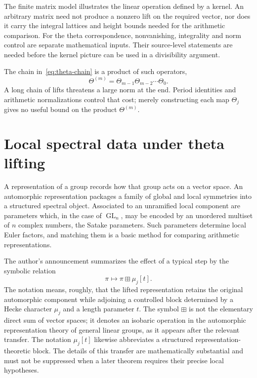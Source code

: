 \documentclass[11pt,openany,oneside]{scrbook}
\theoremstyle{definition}
\theoremstyle{remark}
\begin{document}
The finite matrix model illustrates the linear operation defined by a kernel. An arbitrary matrix need not produce a nonzero lift on the required vector, nor does it carry the integral lattices and height bounds needed for the arithmetic comparison. For the theta correspondence, nonvanishing, integrality and norm control are separate mathematical inputs. Their source-level statements are needed before the kernel picture can be used in a divisibility argument.

The chain in~\eqref{eq:theta-chain} is a product of such operators,
\begin{equation}\label{eq:composite}
\Theta^{(m)}=\Theta_{m-1}\Theta_{m-2}\cdots\Theta_0.
\end{equation}
A long chain of lifts threatens a large norm at the end. Period identities and arithmetic normalizations control that cost; merely constructing each map $\Theta_j$ gives no useful bound on the product $\Theta^{(m)}$.

\section{Local spectral data under theta lifting}

A representation of a group records how that group acts on a vector space. An automorphic representation packages a family of global and local symmetries into a structured spectral object. Associated to an unramified local component are parameters which, in the case of $\operatorname{GL}_n$, may be encoded by an unordered multiset of $n$ complex numbers, the Satake parameters. Such parameters determine local Euler factors, and matching them is a basic method for comparing arithmetic representations.

The author's announcement summarizes the effect of a typical step by the symbolic relation
\begin{equation}\label{eq:isobaric}
\pi\longmapsto\pi\boxplus\mu_j[t].
\end{equation}
The notation means, roughly, that the lifted representation retains the original automorphic component while adjoining a controlled block determined by a Hecke character $\mu_j$ and a length parameter $t$. The symbol $\boxplus$ is not the elementary direct sum of vector spaces; it denotes an isobaric operation in the automorphic representation theory of general linear groups, as it appears after the relevant transfer. The notation $\mu_j[t]$ likewise abbreviates a structured representation-theoretic block. The details of this transfer are mathematically substantial and must not be suppressed when a later theorem requires their precise local hypotheses.
\end{document}

